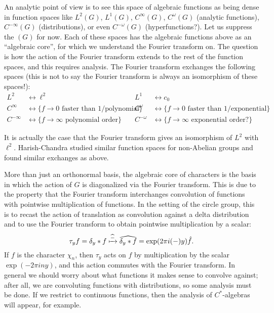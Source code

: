 \documentclass[../../rtnotes.tex]{subfiles}
\begin{document}
An analytic point of view is to see this space of algebraic functions as being dense in function spaces like $L^2(G)$, $L^1(G)$, $C^\infty(G)$, $C^\omega(G)$ (analytic functions), $C^{-\infty}(G)$ (distributions), or even $C^{-\omega}(G)$ (hyperfunctions?). Let us suppress the $(G)$ for now. Each of these spaces has the algebraic functions above as an ``algebraic core'', for which we understand the Fourier transform on. The question is how the action of the Fourier transform extends to the rest of the function spaces, and this requires analysis. The Fourier transform exchanges the following spaces (this is not to say the Fourier transform is always an isomorphism of these spaces!):
\begin{align*}
	L^2 &\longleftrightarrow \ell^2 & L^1 &\longleftrightarrow c_0\\
	C^\infty &\longleftrightarrow \{f\to 0 \text{ faster than } 1/\text{polynomial}\} & C^\omega &\longleftrightarrow \{f\to 0 \text{ faster than } 1/\text{exponential}\}\\
	C^{-\infty} &\longleftrightarrow \{f\to \infty \text{ polynomial order}\} & C^{-\omega} &\longleftrightarrow \{f\to \infty \text{ exponential order?}\}
\end{align*}

It is actually the case that the Fourier transform gives an isomorphism of $L^2$ with $\ell^2$. Harish-Chandra studied similar function spaces for non-Abelian groups and found similar exchanges as above.

More than just an orthonormal basis, the algebraic core of characters is the basis in which the action of $G$ is diagonalized via the Fourier transform. This is due to the property that the Fourier transform interchanges convolution of functions with pointwise multiplication of functions. In the setting of the circle group, this is to recast the action of translation as convolution against a delta distribution and to use the Fourier transform to obtain pointwise multiplication by a scalar:
\[\tau_yf = \delta_y\ast f\xmapsto{\widehat{-}} \widehat{\delta_y\ast f} = \exp(2\pi i(-)y)\hat f.\]
If $f$ is the character $\chi_n$, then $\tau_y$ acts on $f$ by multiplication by the scalar $\exp(-2\pi iny)$, and this action commutes with the Fourier transform. In general we should worry about what functions it makes sense to convolve against; after all, we are convoluting functions with distributions, so some analysis must be done. If we restrict to continuous functions, then the analysis of $C^\ast$-algebras will appear, for example.
\end{document}
